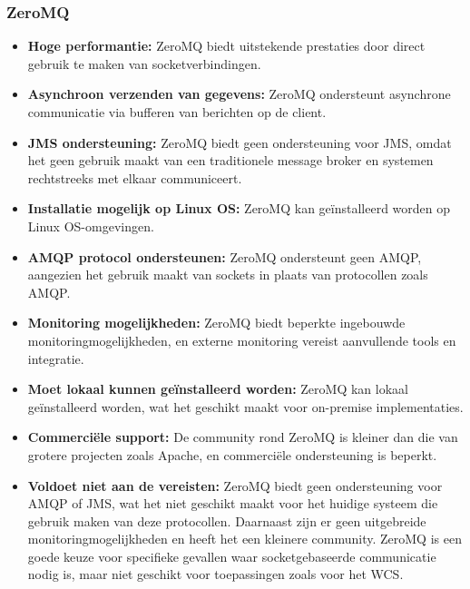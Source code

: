 \subsubsection{ZeroMQ}
\begin{itemize}
    \item \textbf{Hoge performantie:} ZeroMQ biedt uitstekende prestaties door direct gebruik te maken van socketverbindingen.
    \item \textbf{Asynchroon verzenden van gegevens:} ZeroMQ ondersteunt asynchrone communicatie via bufferen van berichten op de client.
    \item \textbf{JMS ondersteuning:} ZeroMQ biedt geen ondersteuning voor JMS, omdat het geen gebruik maakt van een traditionele message broker en systemen rechtstreeks met elkaar communiceert.
    \item \textbf{Installatie mogelijk op Linux OS:} ZeroMQ kan geïnstalleerd worden op Linux OS-omgevingen.
    \item \textbf{AMQP protocol ondersteunen:} ZeroMQ ondersteunt geen AMQP, aangezien het gebruik maakt van sockets in plaats van protocollen zoals AMQP.
    \item \textbf{Monitoring mogelijkheden:} ZeroMQ biedt beperkte ingebouwde monitoringmogelijkheden, en externe monitoring vereist aanvullende tools en integratie.
    \item \textbf{Moet lokaal kunnen geïnstalleerd worden:} ZeroMQ kan lokaal geïnstalleerd worden, wat het geschikt maakt voor on-premise implementaties.
    \item \textbf{Commerciële support:} De community rond ZeroMQ is kleiner dan die van grotere projecten zoals Apache, en commerciële ondersteuning is beperkt.
    \item \textbf{Voldoet niet aan de vereisten:}
    ZeroMQ biedt geen ondersteuning voor AMQP of JMS, wat het niet geschikt maakt voor het huidige systeem die gebruik maken van deze protocollen. 
    Daarnaast zijn er geen uitgebreide monitoringmogelijkheden en heeft het een kleinere community.
    ZeroMQ is een goede keuze voor specifieke gevallen waar socketgebaseerde communicatie nodig is, maar niet geschikt voor toepassingen zoals voor het WCS.
\end{itemize}

 
